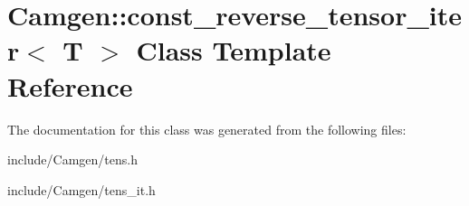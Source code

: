 \hypertarget{a00101}{}\section{Camgen\+:\+:const\+\_\+reverse\+\_\+tensor\+\_\+iter$<$ T $>$ Class Template Reference}
\label{a00101}


The documentation for this class was generated from the following files\+:\begin{DoxyCompactItemize}
\item 
include/\+Camgen/tens.\+h\item 
include/\+Camgen/tens\+\_\+it.\+h\end{DoxyCompactItemize}
